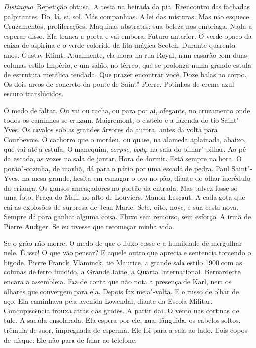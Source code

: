 \emph{Distinguo}. Repetição obtusa. A testa na beirada da pia.
Reencontro das fachadas palpitantes. Do, lá, si, sol. Más companhias. A %
lei das misturas. Mas não esquece. Cruzamentos, proliferações. Máquinas
abstratas: sua beleza nos embriaga. Nada a esperar disso. Ela tranca a
porta e vai embora. Futuro anterior. O verde opaco da caixa de aspirina
e o verde colorido da fita mágica Scotch. Durante quarenta anos. Gustav
Klimt. Atualmente, ela mora na rua Royal, num casarão com duas colunas
estilo Império, e um salão, no térreo, que se prolonga numa grande
estufa de estrutura metálica rendada. Que prazer encontrar você. Doze
balas no corpo. Os dois arcos de concreto da ponte de Saint"-Pierre.
Potinhos de creme azul escuro translúcidos.

O medo de faltar. Ou vai ou racha, ou para por aí, ofegante, no
cruzamento onde todos os caminhos se cruzam. Maigremont, o castelo e a
fazenda do tio Saint"-Yves. Os cavalos sob as grandes árvores da aurora,
antes da volta para Courbevoie. O cachorro que o mordeu, ou quase, na
alameda aplainada, abaixo, que vai até a estufa. O manequim,
\emph{corpse}, \emph{body}, na sala do bilhar"-pilhar. Ao pé da escada,
as vozes na sala de jantar. Hora de dormir. Está sempre na hora. O
porão"-cozinha, de manhã, dá para o pátio por uma escada de pedra. Paul
Saint"-Yves, na mesa grande, hesita em esmagar o ovo no pão, diante do
olhar incrédulo da criança. Os gansos ameaçadores no portão da entrada.
Mas talvez fosse só uma foto. Praça do Mail, no alto de Louviers. Manon
Lescaut. A cada gota que cai as explosões de surpresa de Jean Marie.
Sete, oito, nove, e sua cesta nova. Sempre dá para ganhar alguma coisa.
Fluxo sem remorso, sem esforço. A irmã de Pierre Audiger. Se eu tivesse
que recomeçar minha vida.

Se o grão não morre. O medo de que o fluxo cesse e a humildade de
mergulhar nele. É isso! O que vão pensar? E aquele outro que aprecia e
sentencia torcendo o bigode. Pierre Franck, Vlaminck, tio Maurice, a
grande sala estilo 1900 com as colunas de ferro fundido, a Grande Jatte,
a Quarta Internacional. Bernardette encara a assembleia. Faz de conta
que não nota a presença de Karl, nem os olhares que convergem para ela.
Depois faz meia"-volta. E o russo de olhar de aço. Ela caminhava pela
avenida Lowendal, diante da Escola Militar. Concupiscência frouxa atrás
das grades. A partir daí. O vento nas cortinas de tule. A sacada
ensolarada. Ela espera por ele, nua, lânguida, os cabelos soltos,
trêmula de suor, impregnada de esperma. Ele foi para a sala ao lado.
Dois copos de uísque. Ele não para de falar ao telefone.


